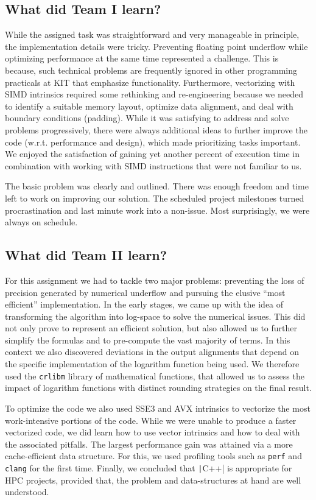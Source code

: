 \documentclass[runningheads,a4paper]{llncs}
\begin{document}
\subsection{What did Team I learn?}
While the assigned task was straightforward and very manageable in principle,
the implementation details were tricky.
Preventing floating point underflow while optimizing performance at the same time represented a challenge. 
This is because, such technical problems are frequently ignored in other programming practicals at KIT 
that emphasize functionality. 
Furthermore, vectorizing with SIMD intrinsics required some rethinking and re-engineering 
because we needed to identify a suitable memory layout, optimize data alignment, 
and deal with boundary conditions (padding). 
While it was satisfying to address and solve problems progressively, 
there were always additional ideas to further improve the code (w.r.t. performance and design), 
which made prioritizing tasks important.
We enjoyed the satisfaction of gaining yet another percent of execution time in combination 
with working with SIMD instructions that were not familiar to us.

The basic problem was clearly and outlined. There was enough freedom and time left 
to work on improving our solution. The scheduled project milestones 
turned procrastination and last minute work into a non-issue. 
Most surprisingly, we were always on schedule.



\subsection{What did Team II learn?}
For this assignment we had to tackle two major problems: preventing the loss of precision generated by numerical underflow and 
pursuing the elusive ``most efficient'' implementation. 
In the early stages, we came up with the idea of transforming the algorithm into log-space to solve the numerical issues. 
This did not only prove to represent an efficient solution, but also allowed us to further simplify the formulas and to pre-compute the vast majority of terms. 
In this context we also discovered deviations in the output alignments
that depend on the specific implementation of the logarithm function being used. 
We therefore used the \texttt{crlibm} library of mathematical functions, that allowed us to assess the impact of logarithm functions with distinct rounding strategies
on the final result.

To optimize the code we also used SSE3 and AVX intrinsics to vectorize the most work-intensive portions of the code. 
While we were unable to produce a faster vectorized code, we did learn how to use vector intrinsics and how to deal with the associated pitfalls. 
The largest performance gain was attained via a more cache-efficient data structure. 
For this, we used profiling tools such as \texttt{perf} and \texttt{clang} for the first time. 
Finally,  we concluded that \texttt|C++| is appropriate for HPC projects, provided that, the problem and data-structures at hand are well understood.
\end{document}
